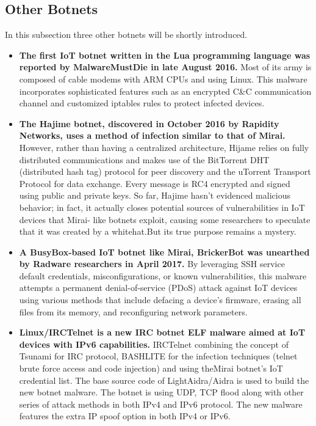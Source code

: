 \documentclass[conference]{IEEEtran}
\begin{document}
\subsection{\textbf{Other Botnets}}

In this subsection three other botnets will be shortly introduced.

\begin{itemize}
\item{
\textbf{The first IoT botnet written in the
Lua programming language was reported
by MalwareMustDie in late August
2016.} Most of its army is composed
of cable modems with ARM CPUs
and using Linux. This malware incorporates
sophisticated features such
as an encrypted C&C communication
channel and customized iptables rules
to protect infected devices.\cite{b8}}

\item{
\textbf{The Hajime botnet, discovered in
October 2016 by Rapidity Networks,
uses a method of infection similar to
that of Mirai.} However, rather than having a centralized architecture, Hijame
relies on fully distributed communications
and makes use of the
BitTorrent DHT (distributed hash tag)
protocol for peer discovery and the
uTorrent Transport Protocol for data
exchange. Every message is RC4 encrypted
and signed using public and
private keys. So far, Hajime hasn’t evidenced
malicious behavior; in fact,
it actually closes potential sources
of vulnerabilities in IoT devices that
Mirai- like botnets exploit, causing
some researchers to speculate that it
was created by a whitehat.But its
true purpose remains a mystery.}

\item{
\textbf{A BusyBox-based IoT botnet like
Mirai, BrickerBot was unearthed by
Radware researchers in April 2017.}
By leveraging SSH service default credentials,
misconfigurations, or known
vulnerabilities, this malware attempts
a permanent denial-of-service (PDoS)
attack against IoT devices using various
methods that include defacing
a device’s firmware, erasing all files
from its memory, and reconfiguring
network parameters.}

\item{
\textbf{
Linux/IRCTelnet is a new IRC botnet ELF malware aimed
at IoT devices with IPv6 capabilities. } IRCTelnet combining
the concept of Tsunami for IRC protocol, BASHLITE
for the infection techniques (telnet brute force access and
code injection) and using theMirai botnet’s IoT credential
list. The base source code of LightAidra/Aidra is used to
build the new botnet malware. The botnet is using UDP,
TCP flood along with other series of attack methods in
both IPv4 and IPv6 protocol. The new malware features
the extra IP spoof option in both IPv4 or IPv6.\cite{b2}}

\end{itemize}
\end{document}
